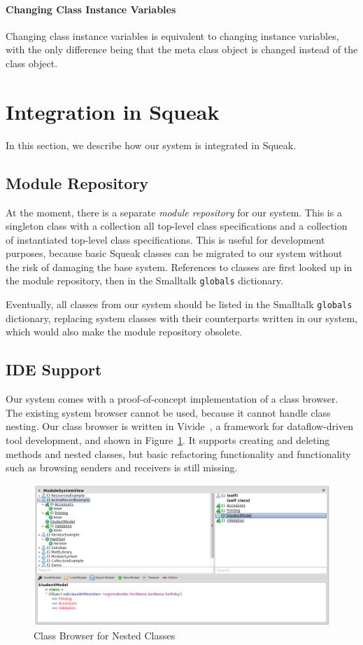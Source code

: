 \paragraph{Changing Class Instance Variables}
Changing class instance variables is equivalent to changing instance variables, with the only difference being that the meta class object is changed instead of the class object.


\section{Integration in Squeak}
In this section, we describe how our system is integrated in Squeak.

\subsection{Module Repository}
At the moment, there is a separate \emph{module repository} for our system. This is a singleton class with a collection all top-level class specifications and a collection of instantiated top-level class specifications. This is useful for development purposes, because basic Squeak classes can be migrated to our system without the risk of damaging the base system. References to classes are first looked up in the module repository, then in the Smalltalk \texttt{globals} dictionary.

Eventually, all classes from our system should be listed in the Smalltalk \texttt{globals} dictionary, replacing system classes with their counterparts written in our system, which would also make the module repository obsolete.

\subsection{IDE Support}
Our system comes with a proof-of-concept implementation of a class browser. The existing system browser cannot be used, because it cannot handle class nesting. Our class browser is written in Vivide~\cite{Taeumel:2012:VPE:2384592.2384604}, a framework for dataflow-driven tool development, and shown in Figure~\ref{fig:impl_class_browser}. It supports creating and deleting methods and nested classes, but basic refactoring functionality and functionality such as browsing senders and receivers is still missing.

\begin{figure}[!htp]
	\centering
	\includegraphics[width=\textwidth]{screenshot_classbrowser.png}
	\caption{Class Browser for Nested Classes}
	\label{fig:impl_class_browser}
\end{figure}

